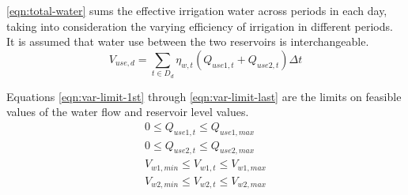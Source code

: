 \autoref{eqn:total-water} sums the effective irrigation water across periods in each day, taking into consideration the varying efficiency of irrigation in different periods.
It is assumed that water use between the two reservoirs is interchangeable.
%
\begin{equation}
\label{eqn:total-water}
V_{use,d} = \sum_{t \in D_d}  \eta_{w,t} \left( Q_{use1,t} +  Q_{use2,t} \right) \Delta t
\end{equation}

Equations \ref{eqn:var-limit-1st} through \ref{eqn:var-limit-last} are the limits on feasible values of the water flow and reservoir level values.
%
\begin{gather}
\label{eqn:var-limit-1st}
0 \le Q_{use1,t} \le Q_{use1,max} \\
0 \le Q_{use2,t} \le Q_{use2,max} \\
V_{w1,min} \le V_{w1,t} \le V_{w1,max} \\
\label{eqn:var-limit-last}
V_{w2,min} \le V_{w2,t} \le V_{w2,max}
\end{gather}


